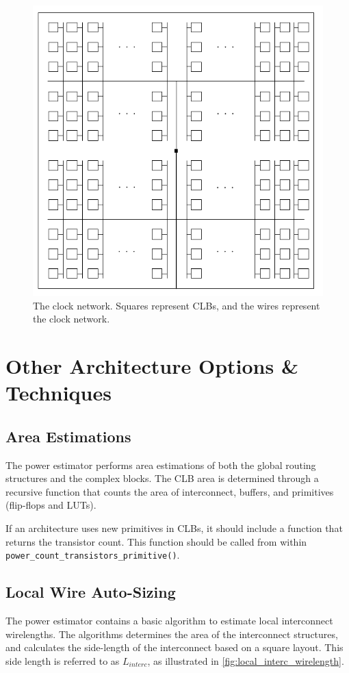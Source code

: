 \documentclass[letterpaper,twoside,10pt]{article}
\begin{document}
\begin{figure}[ht]
	\centering
	\includegraphics[scale=0.7]{images/clock_network}
	\caption{The clock network.  Squares represent CLBs, and the wires represent the clock network.}
	\label{fig:clock_network}
\end{figure}




\clearpage
\section{Other Architecture Options \& Techniques} \label{sec:options}
\subsection{Area Estimations} \label{sec:area_est}
The power estimator performs area estimations of both the global routing structures and the complex blocks.  The CLB area is determined through a recursive function that counts the area of interconnect, buffers, and primitives (flip-flops and LUTs).  

If an architecture uses new primitives in CLBs, it should include a function that returns the transistor count.  This function should be called from within \texttt{power\_count\_transistors\_primitive()}.

\subsection{Local Wire Auto-Sizing} \label{sec:local_wire_autosize}
The power estimator contains a basic algorithm to estimate local interconnect wirelengths.  The algorithms determines the area of the interconnect structures, and calculates the side-length of the interconnect based on a square layout.  This side length is referred to as $L_{interc}$, as illustrated in \autoref{fig:local_interc_wirelength}.
\end{document}
